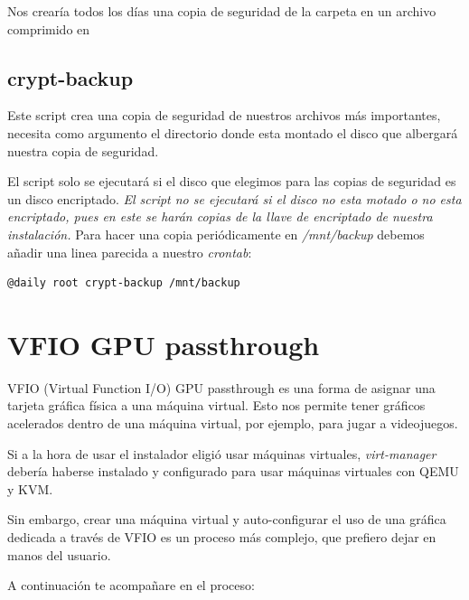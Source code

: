 \documentclass[11pt]{article}
\begin{document}
Nos crearía todos los días una copia de seguridad de la carpeta  en un archivo comprimido en 

\subsection{crypt-backup}

Este script crea una copia de seguridad de nuestros archivos más importantes, necesita como argumento el directorio donde esta montado el disco que albergará nuestra copia de seguridad.

El script solo se ejecutará si el disco que elegimos para las copias de seguridad es un disco encriptado. \textit{El script no se ejecutará si el disco no esta motado o no esta encriptado, pues en este se harán copias de la llave de encriptado de nuestra instalación.} Para hacer una copia periódicamente en \textit{/mnt/backup} debemos añadir una linea parecida a nuestro \textit{crontab}:

\begin{verbatim}
@daily root crypt-backup /mnt/backup
\end{verbatim}

\clearpage

\section{VFIO GPU passthrough}

VFIO (Virtual Function I/O) GPU passthrough es una forma de asignar una tarjeta gráfica física a una máquina virtual. Esto nos permite tener gráficos acelerados dentro de una máquina virtual, por ejemplo, para jugar a videojuegos.

\vspace{5pt}

Si a la hora de usar el instalador eligió usar máquinas virtuales, \textit{virt-manager} debería haberse instalado y configurado para usar máquinas virtuales con QEMU y KVM.

\vspace{5pt}

Sin embargo, crear una máquina virtual y auto-configurar el uso de una gráfica dedicada a través de VFIO es un proceso más complejo, que prefiero dejar en manos del usuario.

\vspace{5pt}

A continuación te acompañare en el proceso:
\end{document}
